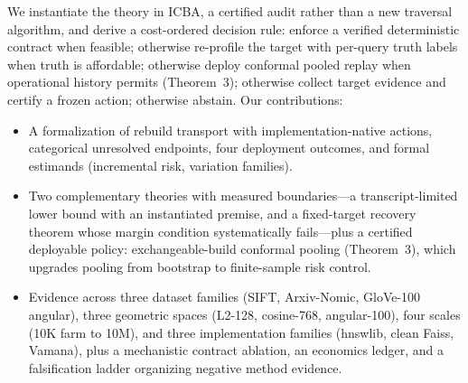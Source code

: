 \documentclass{article}
\begin{document}
We instantiate the theory in ICBA, a certified audit rather than a new traversal algorithm, and derive a
cost-ordered decision rule: enforce a verified deterministic contract when feasible; otherwise
re-profile the target with per-query truth labels when truth is affordable; otherwise deploy conformal
pooled replay when operational history permits (Theorem~3); otherwise collect target evidence and
certify a frozen action; otherwise abstain. Our contributions:
\begin{itemize}\itemsep1pt
\item A formalization of rebuild transport with implementation-native actions, categorical unresolved
endpoints, four deployment outcomes, and formal estimands (incremental risk, variation families).
\item Two complementary theories with measured boundaries---a transcript-limited lower bound with an
instantiated premise, and a fixed-target recovery theorem whose margin condition systematically
fails---plus a certified deployable policy: exchangeable-build conformal pooling (Theorem~3), which
upgrades pooling from bootstrap to finite-sample risk control.
\item Evidence across three dataset families (SIFT, Arxiv-Nomic, GloVe-100 angular), three geometric
spaces (L2-128, cosine-768, angular-100), four scales (10K farm to 10M), and three implementation
families (hnswlib, clean Faiss, Vamana), plus a mechanistic contract ablation, an economics ledger, and
a falsification ladder organizing negative method evidence.
\end{itemize}
\end{document}
